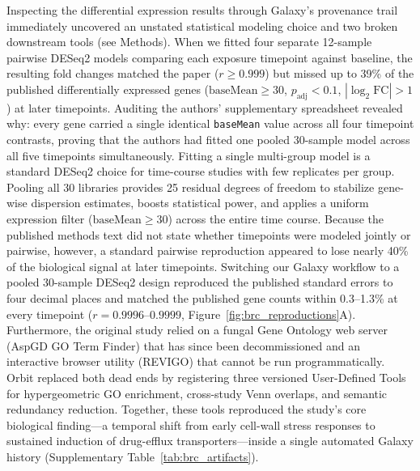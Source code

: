 \documentclass[11pt,letterpaper]{article}
\begin{document}
Inspecting the differential expression results through Galaxy's provenance trail immediately uncovered an unstated statistical modeling choice and two broken downstream tools (see Methods). When we fitted four separate 12-sample pairwise DESeq2 models comparing each exposure timepoint against baseline, the resulting fold changes matched the paper ($r \ge 0.999$) but missed up to 39\% of the published differentially expressed genes ($\text{baseMean} \ge 30$, $p_{\text{adj}} < 0.1$, $|\log_2\text{FC}| > 1$) at later timepoints. Auditing the authors' supplementary spreadsheet revealed why: every gene carried a single identical \texttt{baseMean} value across all four timepoint contrasts, proving that the authors had fitted one pooled 30-sample model across all five timepoints simultaneously. Fitting a single multi-group model is a standard DESeq2 choice for time-course studies with few replicates per group. Pooling all 30 libraries provides 25 residual degrees of freedom to stabilize gene-wise dispersion estimates, boosts statistical power, and applies a uniform expression filter ($\text{baseMean} \ge 30$) across the entire time course. Because the published methods text did not state whether timepoints were modeled jointly or pairwise, however, a standard pairwise reproduction appeared to lose nearly 40\% of the biological signal at later timepoints. Switching our Galaxy workflow to a pooled 30-sample DESeq2 design reproduced the published standard errors to four decimal places and matched the published gene counts within 0.3--1.3\% at every timepoint ($r = 0.9996\text{--}0.9999$, Figure~\ref{fig:brc_reproductions}A). Furthermore, the original study relied on a fungal Gene Ontology web server (AspGD GO Term Finder) that has since been decommissioned and an interactive browser utility (REVIGO) that cannot be run programmatically. Orbit replaced both dead ends by registering three versioned User-Defined Tools for hypergeometric GO enrichment, cross-study Venn overlaps, and semantic redundancy reduction. Together, these tools reproduced the study's core biological finding---a temporal shift from early cell-wall stress responses to sustained induction of drug-efflux transporters---inside a single automated Galaxy history (Supplementary Table~\ref{tab:brc_artifacts}).
\end{document}
